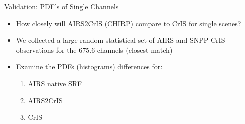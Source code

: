 \documentclass[10pt,t]{beamer}
\begin{document}
\begin{frame}[label={sec:org1d22303}]{Validation: PDF's of Single Channels}
\begin{itemize}
\item How closely will AIRS2CrIS (CHIRP) compare to CrIS for single scenes?
\item We collected a large random statistical set of AIRS and SNPP-CrIS observations for the 675.6 \wn channels (closest match)
\item Examine the PDFs (histograms) differences for:
\begin{enumerate}
\item AIRS native SRF
\item AIRS2CrIS
\item CrIS
\end{enumerate}
\end{itemize}
\end{frame}
\end{document}
